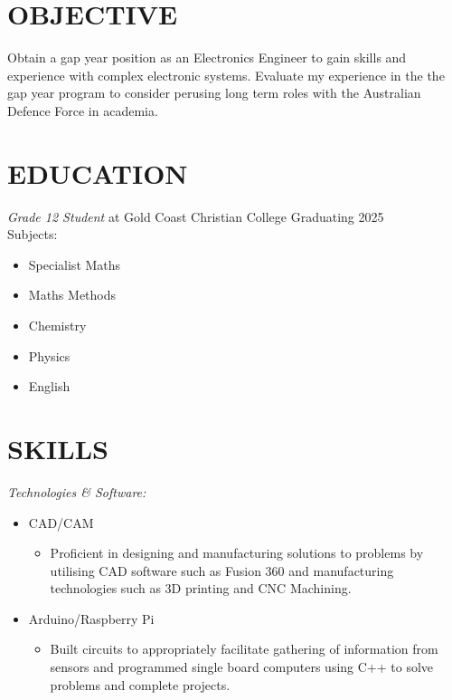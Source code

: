 \documentclass[margin, 10pt]{res} %
\begin{document}
\begin{resume}

 
\section{OBJECTIVE}  
Obtain a gap year position as an Electronics Engineer to gain skills and experience with complex electronic systems. Evaluate my experience in the the gap year program to consider perusing long term roles with the Australian Defence Force in academia.



\section{EDUCATION}

{\sl Grade 12 Student} at Gold Coast Christian College \hfill Graduating 2025\\
Subjects:\\
\begin{itemize}
	\item Specialist Maths 
	\item Maths Methods 
	\item Chemistry  
	\item Physics  
	\item English 
\end{itemize}


 

\section{SKILLS} 

{\sl Technologies \& Software:} 
\begin{itemize}
	\item  CAD/CAM
	\begin{itemize}
		\item Proficient in designing and manufacturing solutions to problems by utilising CAD software such as Fusion 360 and manufacturing technologies such as 3D printing and CNC Machining.
	\end{itemize}
	\item Arduino/Raspberry Pi
	\begin{itemize}
		\item Built circuits to appropriately facilitate gathering of information from sensors and programmed single board computers using C++ to solve problems and complete projects.
	\end{itemize}
		

\end{itemize}
\end{resume}
\end{document}
